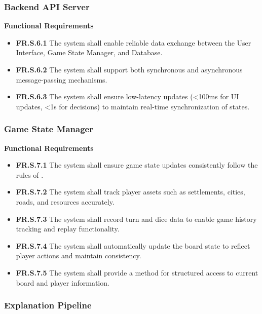 \documentclass{article}
\begin{document}
\subsubsection{Backend API Server}

\textbf{Functional Requirements}

\begin{itemize}
  \item \label{FR.S.6.1}\textbf{FR.S.6.1} The system shall enable reliable data exchange between the User Interface, Game State Manager, and Database.
  \item \label{FR.S.6.2}\textbf{FR.S.6.2} The system shall support both synchronous and asynchronous message-passing mechanisms.
  \item \label{FR.S.6.3}\textbf{FR.S.6.3} The system shall ensure low-latency updates (\textless100ms for UI updates, \textless1s for \AI{} decisions) to maintain real-time synchronization of states.
\end{itemize}

\subsubsection{Game State Manager}

\textbf{Functional Requirements}

\begin{itemize}
  \item \label{FR.S.7.1}\textbf{FR.S.7.1} The system shall ensure game state updates consistently follow the rules of \emph{\Catan{}}.
  \item \label{FR.S.7.2}\textbf{FR.S.7.2} The system shall track player assets such as settlements, cities, roads, and resources accurately.
  \item \label{FR.S.7.3}\textbf{FR.S.7.3} The system shall record turn and dice data to enable game history tracking and replay functionality.
  \item \label{FR.S.7.4}\textbf{FR.S.7.4} The system shall automatically update the board state to reflect player actions and maintain consistency.
  \item \label{FR.S.7.5}\textbf{FR.S.7.5} The system shall provide a method for structured access to current board and player information.
\end{itemize}

\subsubsection{Explanation Pipeline}
\end{document}
